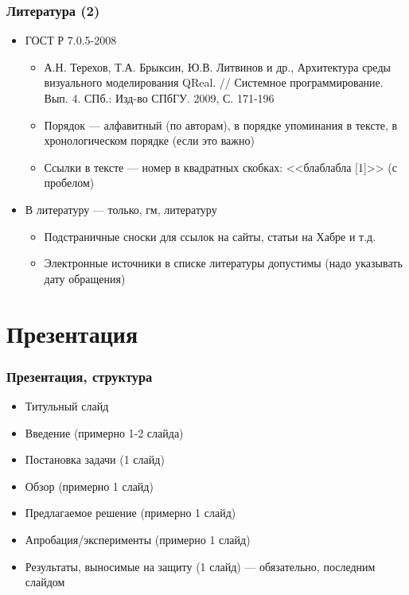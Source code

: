 \documentclass[xetex,mathserif,serif]{beamer}
\begin{document}
    \begin{frame}
        \frametitle{Литература (2)}
        \begin{itemize}
            \item ГОСТ Р 7.0.5-2008
            \begin{itemize}
                \item А.Н. Терехов, Т.А. Брыксин, Ю.В. Литвинов и др., Архитектура среды визуального моделирования QReal. // Системное программирование. Вып. 4. СПб.: Изд-во СПбГУ. 2009, С. 171-196
                \item Порядок --- алфавитный (по авторам), в порядке упоминания в тексте, в хронологическом порядке (если это важно)
                \item Ссылки в тексте --- номер в квадратных скобках: <<блаблабла [1]>> (с пробелом)
            \end{itemize}
            \item В литературу --- только, гм, литературу
            \begin{itemize}
                \item Подстраничные сноски для ссылок на сайты, статьи на Хабре и т.д.
                \item Электронные источники в списке литературы допустимы (надо указывать дату обращения)
            \end{itemize}
        \end{itemize}
    \end{frame}

    \section{Презентация}

    \begin{frame}
        \frametitle{Презентация, структура}
        \begin{itemize}
            \item Титульный слайд
            \item Введение (примерно 1-2 слайда)
            \item Постановка задачи (1 слайд)
            \item Обзор (примерно 1 слайд)
            \item Предлагаемое решение (примерно 1 слайд)
            \item Апробация/эксперименты (примерно 1 слайд)
            \item Результаты, выносимые на защиту (1 слайд) --- обязательно, последним слайдом
        \end{itemize}
    \end{frame}
\end{document}
